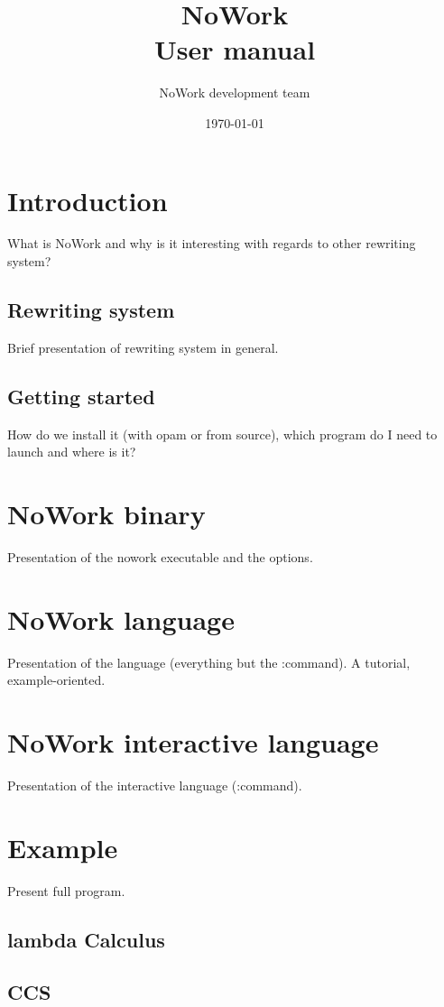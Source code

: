 \documentclass[12pt,a4paper]{article}
\title{NoWork\\
User manual}
\author{NoWork development team\\[2em]}
\date\today
\begin{document}
\maketitle

\section{Introduction}

What is NoWork and why is it interesting with regards to other rewriting system?

\subsection{Rewriting system}

Brief presentation of rewriting system in general.

\subsection{Getting started}

How do we install it (with opam or from source), which program do I need to launch and where is it?


\section{NoWork binary}

Presentation of the nowork executable and the options.

\section{NoWork language}

Presentation of the language (everything but the :command). A tutorial, example-oriented.

\section{NoWork interactive language}

Presentation of the interactive language (:command).

\section{Example}

Present full program.

\subsection{lambda Calculus}

\subsection{CCS}
\end{document}
